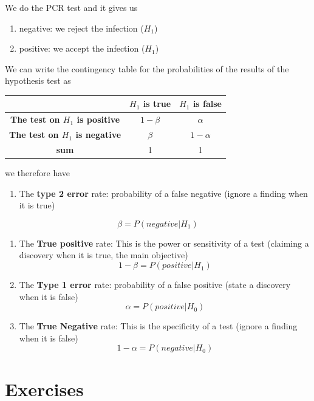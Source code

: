 \documentclass[
]{book}
\providecommand{\tightlist}{%
  \setlength{\itemsep}{0pt}\setlength{\parskip}{0pt}}
\begin{document}
We do the PCR test and it gives us

\begin{enumerate}
\def\labelenumi{\roman{enumi}.}
\tightlist
\item
  negative: we reject the infection (\(H_1\))
\item
  positive: we accept the infection (\(H_1\))
\end{enumerate}

We can write the contingency table for the probabilities of the results of the hypothesis test as

\begin{longtable}[]{@{}ccc@{}}
\toprule\noalign{}
& \(H_1\) is true & \(H_1\) is false \\
\midrule\noalign{}
\endhead
\bottomrule\noalign{}
\endlastfoot
\textbf{The test on \(H_1\) is positive} & \(1-\beta\) & \(\alpha\) \\
\textbf{The test on \(H_1\) is negative} & \(\beta\) & \(1-\alpha\) \\
\textbf{sum} & 1 & 1 \\
\end{longtable}

we therefore have

\begin{enumerate}
\def\labelenumi{\arabic{enumi}.}
\tightlist
\item
  The \textbf{type 2 error} rate: probability of a false negative (ignore a finding when it is true)
\end{enumerate}

\[\beta=P(negative|H_1)\]

\begin{enumerate}
\def\labelenumi{\arabic{enumi}.}
\setcounter{enumi}{1}
\item
  The \textbf{True positive} rate: This is the power or sensitivity of a test (claiming a discovery when it is true, the main objective)
  \[1-\beta=P(positive|H_1)\]
\item
  The \textbf{Type 1 error} rate: probability of a false positive (state a discovery when it is false)
  \[\alpha=P(positive|H_0)\]
\item
  The \textbf{True Negative} rate: This is the specificity of a test (ignore a finding when it is false)
  \[1-\alpha=P(negative|H_0)\]
\end{enumerate}

\hypertarget{exercises-12}{%
\section{Exercises}\label{exercises-12}}
\end{document}
